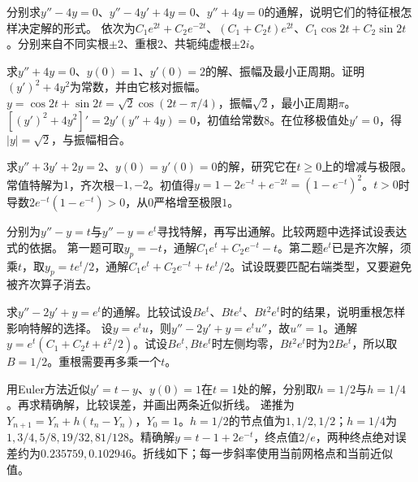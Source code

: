 分别求\(y''-4y=0\)、\(y''-4y'+4y=0\)、\(y''+4y=0\)的通解，说明它们的特征根怎样决定解的形式。
\solutionanswer
依次为\(C_1e^{2t}+C_2e^{-2t}\)、\((C_1+C_2t)e^{2t}\)、\(C_1\cos2t+C_2\sin2t\)。分别来自不同实根\(\pm2\)、重根\(2\)、共轭纯虚根\(\pm2i\)。


求\(y''+4y=0\)、\(y(0)=1\)、\(y'(0)=2\)的解、振幅及最小正周期。证明\((y')^2+4y^2\)为常数，并由它核对振幅。
\solutionanswer
\(y=\cos2t+\sin2t=\sqrt2\cos(2t-\pi/4)\)，振幅\(\sqrt2\)，最小正周期\(\pi\)。\([(y')^2+4y^2]'=2y'(y''+4y)=0\)，初值给常数\(8\)。在位移极值处\(y'=0\)，得\(|y|=\sqrt2\)，与振幅相合。


求\(y''+3y'+2y=2\)、\(y(0)=y'(0)=0\)的解，研究它在\(t\ge0\)上的增减与极限。
\solutionanswer
常值特解为\(1\)，齐次根\(-1,-2\)。初值得\(y=1-2e^{-t}+e^{-2t}=(1-e^{-t})^2\)。\(t>0\)时导数\(2e^{-t}(1-e^{-t})>0\)，从\(0\)严格增至极限\(1\)。


分别为\(y''-y=t\)与\(y''-y=e^t\)寻找特解，再写出通解。比较两题中选择试设表达式的依据。
\solutionanswer
第一题可取\(y_p=-t\)，通解\(C_1e^t+C_2e^{-t}-t\)。第二题\(e^t\)已是齐次解，须乘\(t\)，取\(y_p=te^t/2\)，通解\(C_1e^t+C_2e^{-t}+te^t/2\)。试设既要匹配右端类型，又要避免被齐次算子消去。


求\(y''-2y'+y=e^t\)的通解。比较试设\(Be^t\)、\(Bte^t\)、\(Bt^2e^t\)时的结果，说明重根怎样影响特解的选择。
\solutionanswer
设\(y=e^tu\)，则\(y''-2y'+y=e^tu''\)，故\(u''=1\)。通解\(y=e^t(C_1+C_2t+t^2/2)\)。试设\(Be^t,Bte^t\)时左侧均零，\(Bt^2e^t\)时为\(2Be^t\)，所以取\(B=1/2\)。重根需要再多乘一个\(t\)。


用Euler方法近似\(y'=t-y\)、\(y(0)=1\)在\(t=1\)处的解，分别取\(h=1/2\)与\(h=1/4\)。再求精确解，比较误差，并画出两条近似折线。
\solutionanswer
递推为\(Y_{n+1}=Y_n+h(t_n-Y_n)\)，\(Y_0=1\)。\(h=1/2\)的节点值为\(1,1/2,1/2\)；\(h=1/4\)为\(1,3/4,5/8,19/32,81/128\)。精确解\(y=t-1+2e^{-t}\)，终点值\(2/e\)，两种终点绝对误差约为\(0.235759,0.102946\)。折线如下；每一步斜率使用当前网格点和当前近似值。
\begin{center}\end{center}


